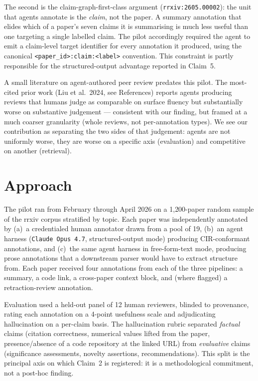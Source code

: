 \documentclass{rrxiv}
\begin{document}
The second is the claim-graph-first-class argument (\texttt{rrxiv:2605.00002}): the unit that agents annotate is the \emph{claim}, not the paper. A summary annotation that elides which of a paper's seven claims it is summarising is much less useful than one targeting a single labelled claim. The pilot accordingly required the agent to emit a claim-level target identifier for every annotation it produced, using the canonical \texttt{\textless{}paper\_id\textgreater{}:claim:\textless{}label\textgreater{}} convention. This constraint is partly responsible for the structured-output advantage reported in Claim~5.

A small literature on agent-authored peer review predates this pilot. The most-cited prior work (Liu et al.\ 2024, see References) reports agents producing reviews that humans judge as comparable on surface fluency but substantially worse on substantive judgement --- consistent with our finding, but framed at a much coarser granularity (whole reviews, not per-annotation types). We see our contribution as separating the two sides of that judgement: agents are not uniformly worse, they are worse on a specific axis (evaluation) and competitive on another (retrieval).

\section{Approach}
\label{sec:approach}

The pilot ran from February through April 2026 on a 1{,}200-paper random sample of the rrxiv corpus stratified by topic. Each paper was independently annotated by (a)~a credentialed human annotator drawn from a pool of 19, (b)~an agent harness (\texttt{Claude Opus 4.7}, structured-output mode) producing CIR-conformant annotations, and (c)~the same agent harness in free-form-text mode, producing prose annotations that a downstream parser would have to extract structure from. Each paper received four annotations from each of the three pipelines: a summary, a code link, a cross-paper context block, and (where flagged) a retraction-review annotation.

Evaluation used a held-out panel of 12 human reviewers, blinded to provenance, rating each annotation on a 4-point usefulness scale and adjudicating hallucination on a per-claim basis. The hallucination rubric separated \emph{factual} claims (citation correctness, numerical values lifted from the paper, presence/absence of a code repository at the linked URL) from \emph{evaluative} claims (significance assessments, novelty assertions, recommendations). This split is the principal axis on which Claim~2 is registered: it is a methodological commitment, not a post-hoc finding.
\end{document}
